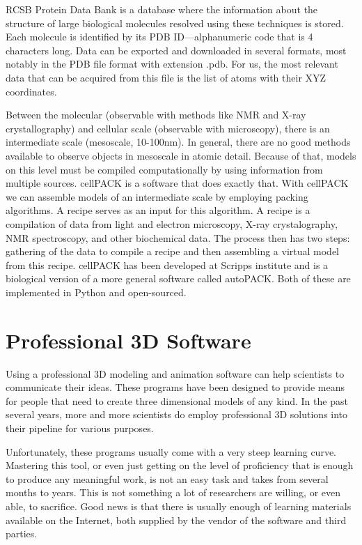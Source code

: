 \documentclass[
  digital, %
  table,   %
  nolof,     %
  nolot,     %
  oneside,
]{fithesis3}
\begin{document}
RCSB Protein Data Bank is a database where the information about the structure of large biological molecules resolved using these techniques is stored. Each molecule is identified by its PDB ID—alphanumeric code that is 4 characters long. Data can be exported and downloaded in several formats, most notably in the PDB file format with extension .pdb. For us, the most relevant data that can be acquired from this file is the list of atoms with their XYZ coordinates.

Between the molecular (observable with methods like NMR and X-ray crystallography) and cellular scale (observable with microscopy), there is an intermediate scale (mesoscale, 10-100nm). In general, there are no good methods available to observe objects in mesoscale in atomic detail. Because of that, models on this level must be compiled computationally by using information from multiple sources. cellPACK \cite{cellPACK} is a software that does exactly that. With cellPACK we can assemble models of an intermediate scale by employing packing algorithms. A recipe serves as an input for this algorithm. A recipe is a compilation of data from light and electron microscopy, X-ray crystalography, NMR spectroscopy, and other biochemical data. The process then has two steps: gathering of the data to compile a recipe and then assembling a virtual model from this recipe. cellPACK has been developed at Scripps institute and is a biological version of a more general software called autoPACK. Both of these are implemented in Python and open-sourced.

\section{Professional 3D Software}
Using a professional 3D modeling and animation software can help scientists to communicate their ideas. These programs have been designed to provide means for people that need to create three dimensional models of any kind. In the past several years, more and more scientists do employ professional 3D solutions into their pipeline for various purposes.

Unfortunately, these programs usually come with a very steep learning curve. Mastering this tool, or even just getting on the level of proficiency that is enough to produce any meaningful work, is not an easy task and takes from several months to years. This is not something a lot of researchers are willing, or even able, to sacrifice. Good news is that there is usually enough of learning materials available on the Internet, both supplied by the vendor of the software and third parties.
\end{document}
